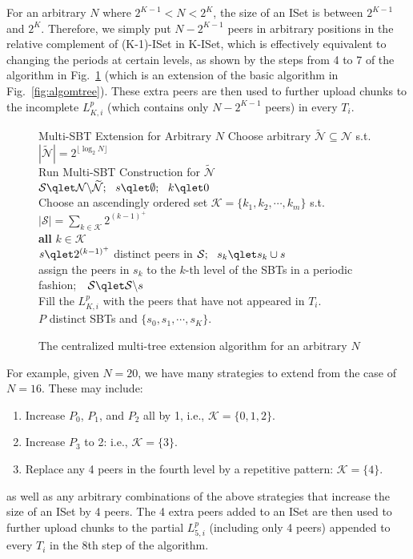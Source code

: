 \documentclass[conference]{IEEEtran}
\begin{document}
  For an arbitrary $N$ where $2^{K-1} < N < 2^K$, the size of an ISet is between $2^{K-1}$ and $2^K$. Therefore, we simply put $N-2^{K-1}$ peers in arbitrary positions in the relative complement of (K-1)\mbox{-ISet} in K\mbox{-ISet}, which is effectively equivalent to changing the periods at certain levels, as shown by the steps from 4 to 7 of the algorithm in Fig.~\ref{fig:algomtreeplus} (which is an extension of the basic algorithm in Fig.~\ref{fig:algomtree}). These extra peers are then used to further upload chunks to the incomplete $L^p_{K,i}$ (which contains only $N-2^{K-1}$ peers) in every $T_i$.
\begin{figure}[htb]
  \begin{algorithm}{Multi-SBT Extension for Arbitrary $N$}{
  \label{algo:algoext}}
Choose arbitrary $\widetilde{\mathcal{N}} \subseteq \mathcal{N}$ s.t. $|\widetilde{\mathcal{N}}| = 2^{\lfloor\log_2 N \rfloor}$ \\
  Run Multi-SBT Construction for $\widetilde{\mathcal{N}}$ \\
  $\mathcal{S} \qlet \mathcal{N} \backslash \widetilde{\mathcal{N}};~~s \qlet \emptyset;~~k \qlet 0$ \\
  Choose an ascendingly ordered set $\mathcal{K} = \{k_1, k_2, \cdots, k_m\}$ s.t. $|\mathcal{S}| = \sum_{k\in\mathcal{K}} 2^{(k-1)^+}$ \\
  \qfor \textbf{all} $k\in\mathcal{K}$ \\
    $s \qlet 2^{(k-1)^+}$ distinct peers in $\mathcal{S};~~s_k \qlet s_k \cup s$ \\
    \qdo assign the peers in $s_k$ to the $k$-th level of the SBTs in a periodic fashion;~~$\mathcal{S} \qlet \mathcal{S} \backslash s$ \qrof\\
  Fill the $L^p_{K,i}$ with the peers that have not appeared in $T_i$.\\
  \qreturn $P$ distinct SBTs and $\{s_0, s_1, \cdots, s_K\}$.
  \end{algorithm}
  \caption{The centralized multi-tree extension algorithm for an arbitrary $N$} \label{fig:algomtreeplus}
  \end{figure}
For example, given $N=20$, we have many strategies to extend from the case of $N=16$. These may include:
\begin{enumerate}
\item Increase $P_0$, $P_1$, and $P_2$ all by 1, i.e., $\mathcal{K} = \{0,1,2\}$.
\item Increase $P_3$ to 2: i.e., $\mathcal{K} = \{3\}$.
\item Replace any 4 peers in the fourth level by a repetitive pattern: $\mathcal{K} = \{4\}$.
\end{enumerate}
as well as any arbitrary combinations of the above strategies that increase the size of an ISet by 4 peers. The 4 extra peers added to an ISet are then used to further upload chunks to the partial $L^p_{5,i}$ (including only 4 peers) appended to every $T_i$ in the 8th step of the algorithm.
\end{document}
